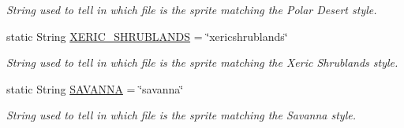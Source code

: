 \begin{DoxyCompactItemize}
\begin{DoxyCompactList}\small\item\em String used to tell in which file is the sprite matching the Polar Desert style. \end{DoxyCompactList}\item 
static String \hyperlink{a00040_a03cab029cbad9fdfa722122d3393c06c}{X\-E\-R\-I\-C\-\_\-\-S\-H\-R\-U\-B\-L\-A\-N\-D\-S} = \char`\"{}xericshrublands\char`\"{}
\begin{DoxyCompactList}\small\item\em String used to tell in which file is the sprite matching the Xeric Shrublands style. \end{DoxyCompactList}\item 
static String \hyperlink{a00023_a69e8a9867db3a93074a41573940424b2}{S\-A\-V\-A\-N\-N\-A} = \char`\"{}savanna\char`\"{}
\begin{DoxyCompactList}\small\item\em String used to tell in which file is the sprite matching the Savanna style. \end{DoxyCompactList}\end{DoxyCompactItemize}
